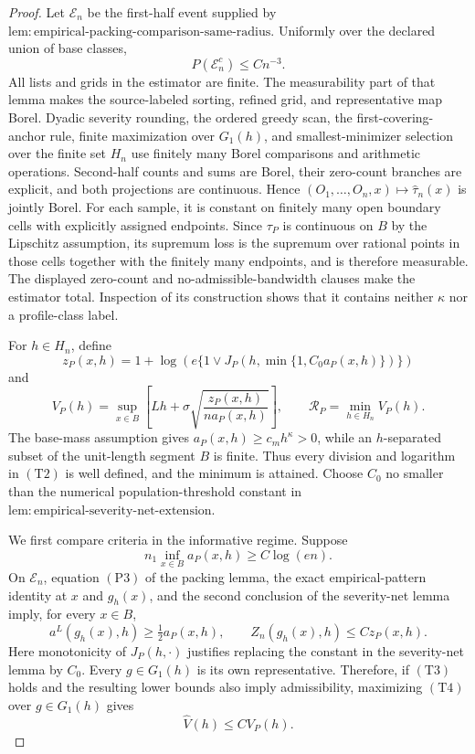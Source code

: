 \documentclass{article}
\begin{document}
\begin{proof}
Let \(\mathcal E_n\) be the first-half event supplied by
\(\mathrm{lem{:}empirical\text{-}packing\text{-}comparison\text{-}same\text{-}radius}\).
Uniformly over the declared union of base classes,
\[
 P(\mathcal E_n^c)\leq Cn^{-3}.
 \tag{T1}
\]
All lists and grids in the estimator are finite.  The measurability part of
that lemma makes the source-labeled sorting, refined grid, and representative
map Borel.  Dyadic severity rounding, the ordered greedy scan, the
first-covering-anchor rule, finite maximization over \(G_1(h)\), and
smallest-minimizer selection over the finite set \(H_n\) use finitely many
Borel comparisons and arithmetic operations.  Second-half counts and sums
are Borel, their zero-count branches are explicit, and both projections are
continuous.  Hence
\((O_1,\ldots,O_n,x)\mapsto\widehat\tau_n(x)\) is jointly Borel.  For each
sample, it is constant on finitely many open boundary cells with explicitly
assigned endpoints.  Since \(\tau_P\) is continuous on \(B\) by the
Lipschitz assumption, its supremum loss is the supremum over rational points
in those cells together with the finitely many endpoints, and is therefore
measurable.  The displayed zero-count and no-admissible-bandwidth clauses
make the estimator total.  Inspection of its construction shows that it
contains neither \(\kappa\) nor a profile-class label.

For \(h\in H_n\), define
\[
 z_P(x,h)=1+\log\!\left(
 e\{1\vee J_P(h,\min\{1,C_0a_P(x,h)\})\}\right)
\]
and
\[
 V_P(h)=\sup_{x\in B}\left[
 Lh+\sigma\sqrt{\frac{z_P(x,h)}{na_P(x,h)}}\right],
 \qquad
 \mathcal R_P=\min_{h\in H_n}V_P(h).
 \tag{T2}
\]
The base-mass assumption gives
\(a_P(x,h)\geq c_mh^\kappa>0\), while an \(h\)-separated subset of the
unit-length segment \(B\) is finite.  Thus every division and logarithm in
\((\mathrm{T2})\) is well defined, and the minimum is attained.  Choose
\(C_0\) no smaller than the numerical population-threshold constant in
\(\mathrm{lem{:}empirical\text{-}severity\text{-}net\text{-}extension}\).

We first compare criteria in the informative regime.  Suppose
\[
 n_1\inf_{x\in B}a_P(x,h)\geq C\log(en).
 \tag{T3}
\]
On \(\mathcal E_n\), equation \((\mathrm{P3})\) of the packing lemma, the
exact empirical-pattern identity at \(x\) and \(g_h(x)\), and the second
conclusion of the severity-net lemma imply, for every \(x\in B\),
\[
 a^L(g_h(x),h)\geq\tfrac12a_P(x,h),
 \qquad
 Z_n(g_h(x),h)\leq C z_P(x,h).
 \tag{T4}
\]
Here monotonicity of \(J_P(h,\cdot)\) justifies replacing the constant in
the severity-net lemma by \(C_0\).  Every \(g\in G_1(h)\) is its own
representative.  Therefore, if \((\mathrm{T3})\) holds and the resulting
lower bounds also imply admissibility, maximizing \((\mathrm{T4})\) over
\(g\in G_1(h)\) gives
\[
 \widehat V(h)\leq C V_P(h).
 \tag{T5}
\]


\end{proof}
\end{document}
